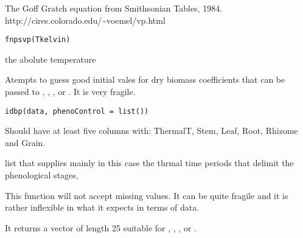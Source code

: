 \documentclass[letterpaper]{book}
\begin{document}
%
\begin{Description}\relax
The Goff Gratch equation from Smithsonian Tables, 1984.
http://cires.colorado.edu/\textasciitilde{}voemel/vp.html
\end{Description}
%
\begin{Usage}
\begin{verbatim}
fnpsvp(Tkelvin)
\end{verbatim}
\end{Usage}
%
\begin{Arguments}
\begin{ldescription}
\item[\code{Tkelvin}] the abolute temperature
\end{ldescription}
\end{Arguments}
%
\begin{Description}\relax
Atempts to guess good initial vales for dry biomass
coefficients that can be passed to ,
, , or
.  It is very fragile.
\end{Description}
%
\begin{Usage}
\begin{verbatim}
idbp(data, phenoControl = list())
\end{verbatim}
\end{Usage}
%
\begin{Arguments}
\begin{ldescription}
\item[\code{data}] Should have at least five columns with:
ThermalT, Stem, Leaf, Root, Rhizome and Grain.

\item[\code{phenoControl}] list that supplies mainly in this
case the thrmal time periods that delimit the
phenological stages,
\end{ldescription}
\end{Arguments}
%
\begin{Details}\relax
This function will not accept missing values. It can be
quite fragile and it is rather inflexible in what it
expects in terms of data.
\end{Details}
%
\begin{Value}
It returns a vector of length 25 suitable for
, , , or
.
\end{Value}
\end{document}
